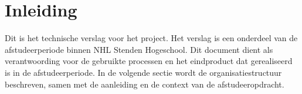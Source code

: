 \chapter{Inleiding}
Dit is het technische verslag voor het  project.
Het verslag is een onderdeel van de afstudeerperiode binnen NHL Stenden Hogeschool.
Dit document dient als verantwoording voor de gebruikte processen en het eindproduct dat gerealiseerd is in de afstudeerperiode.
In de volgende sectie wordt de organisatiestructuur beschreven, samen met de aanleiding en de context van de afstudeeropdracht.


 

\newpage


